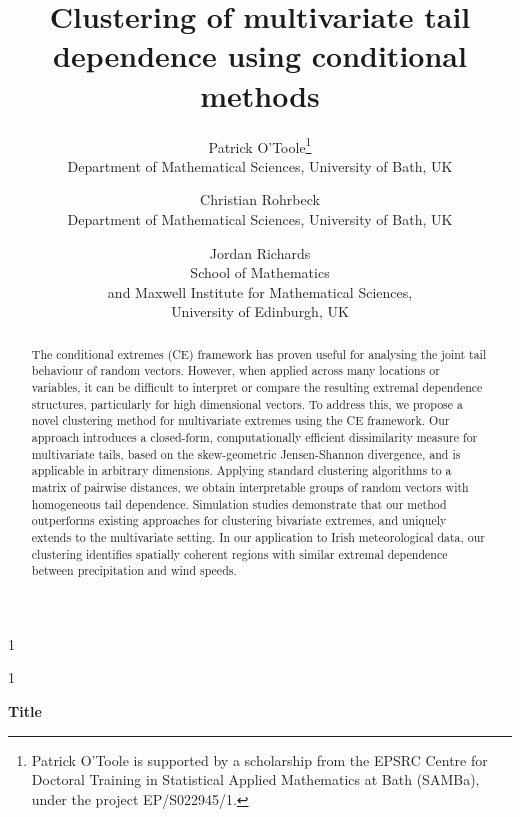 \documentclass[preprint,12pt,authoryear]{elsarticle}
\newcommand{\blind}{1}
\begin{document}
\def\spacingset#1{\renewcommand{\baselinestretch}%
{#1}\small\normalsize} \spacingset{1}


\blind
{
  \title{\bf Clustering of multivariate tail dependence using conditional methods}
  \author{%
  Patrick O'Toole\thanks{Patrick O'Toole is supported by a scholarship from the EPSRC Centre for Doctoral Training in Statistical Applied Mathematics at Bath (SAMBa), under the project EP/S022945/1.}\\
  Department of Mathematical Sciences, University of Bath, UK
  \and
  Christian Rohrbeck\\
  Department of Mathematical Sciences, University of Bath, UK 
  \and
  Jordan Richards\\
  School of Mathematics \\
  and Maxwell Institute for Mathematical Sciences, \\
  University of Edinburgh, UK
  }
  \maketitle
} \fi

\blind
{
  \begin{center}
    {\LARGE\bf Title}
\end{center}
  \medskip
} \fi


\begin{abstract}
  The conditional extremes (CE) framework has proven useful for analysing the joint tail behaviour of random vectors.
  However, when applied across many locations or variables, it can be difficult to interpret or compare the resulting extremal dependence structures, particularly for high dimensional vectors. 
  To address this, we propose a novel clustering method for multivariate extremes using the CE framework.
  Our approach introduces a closed-form, computationally efficient dissimilarity measure for multivariate tails, based on the skew-geometric Jensen-Shannon divergence, and is applicable in arbitrary dimensions.
  Applying standard clustering algorithms to a matrix of pairwise distances, we obtain interpretable groups of random vectors with homogeneous tail dependence.
  Simulation studies demonstrate that our method outperforms existing approaches for clustering bivariate extremes, and uniquely extends to the multivariate setting. 
  In our application to Irish meteorological data, our clustering identifies spatially coherent regions with similar extremal dependence between precipitation and wind speeds. 
\end{abstract}
\end{document}
